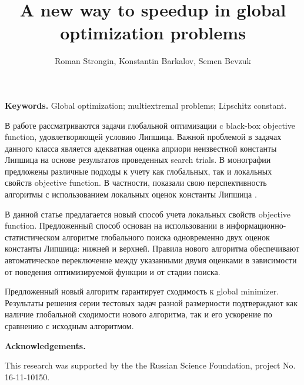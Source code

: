 \documentclass[oribibl]{llncs}
\begin{document}
\cleardoublepage

\title{A new way to speedup in global optimization problems}
\author{Roman Strongin, Konstantin Barkalov, Semen Bevzuk}



\maketitle

\thispagestyle{fancy}

\textbf{Keywords.} Global optimization; multiextremal problems; Lipschitz constant.

 \vspace*{0.5cm}


В работе рассматриваются задачи глобальной оптимизации c black-box objective function, удовлетворяющей условию Липшица. Важной проблемой в задачах данного класса является адекватная оценка априори неизвестной константы Липшица на основе результатов проведенных search trials. В монографии \cite{Book} предложены различные подходы к учету как глобальных, так и локальных свойств objective function. В частности, показали свою перспективность  алгоритмы с использованием локальных оценок константы Липшица \cite{Sergeyev10, Sergeyev16}.

В данной статье предлагается новый способ учета локальных свойств objective function. Предложенный способ основан на использовании в информационно-статистическом алгоритме глобального поиска \cite{Book} одновременно двух оценок константы Липшица: нижней и верхней. Правила нового алгоритма обеспечивают автоматическое переключение между указанными двумя оценками в зависимости от поведения оптимизируемой функции и от стадии поиска.

Предложенный новый алгоритм гарантирует сходимость к global minimizer. Результаты решения серии тестовых задач разной размерности подтверждают как наличие глобальной сходимости  нового алгоритма, так и его ускорение по сравнению с исходным алгоритмом.

\textbf{Acknowledgements.}

This research was supported by the the Russian Science Foundation, project No.\,16-11-10150.
\end{document}
